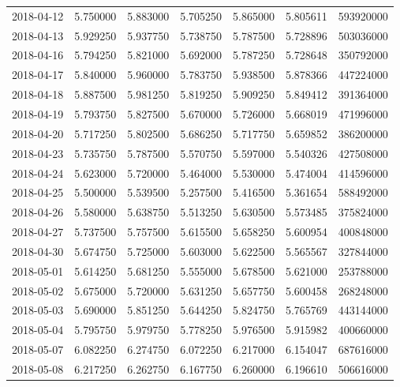 \begin{tabular}{lrrrrrr}
2018-04-12 &    5.750000 &    5.883000 &    5.705250 &    5.865000 &    5.805611 &   593920000 \\
2018-04-13 &    5.929250 &    5.937750 &    5.738750 &    5.787500 &    5.728896 &   503036000 \\
2018-04-16 &    5.794250 &    5.821000 &    5.692000 &    5.787250 &    5.728648 &   350792000 \\
2018-04-17 &    5.840000 &    5.960000 &    5.783750 &    5.938500 &    5.878366 &   447224000 \\
2018-04-18 &    5.887500 &    5.981250 &    5.819250 &    5.909250 &    5.849412 &   391364000 \\
2018-04-19 &    5.793750 &    5.827500 &    5.670000 &    5.726000 &    5.668019 &   471996000 \\
2018-04-20 &    5.717250 &    5.802500 &    5.686250 &    5.717750 &    5.659852 &   386200000 \\
2018-04-23 &    5.735750 &    5.787500 &    5.570750 &    5.597000 &    5.540326 &   427508000 \\
2018-04-24 &    5.623000 &    5.720000 &    5.464000 &    5.530000 &    5.474004 &   414596000 \\
2018-04-25 &    5.500000 &    5.539500 &    5.257500 &    5.416500 &    5.361654 &   588492000 \\
2018-04-26 &    5.580000 &    5.638750 &    5.513250 &    5.630500 &    5.573485 &   375824000 \\
2018-04-27 &    5.737500 &    5.757500 &    5.615500 &    5.658250 &    5.600954 &   400848000 \\
2018-04-30 &    5.674750 &    5.725000 &    5.603000 &    5.622500 &    5.565567 &   327844000 \\
2018-05-01 &    5.614250 &    5.681250 &    5.555000 &    5.678500 &    5.621000 &   253788000 \\
2018-05-02 &    5.675000 &    5.720000 &    5.631250 &    5.657750 &    5.600458 &   268248000 \\
2018-05-03 &    5.690000 &    5.851250 &    5.644250 &    5.824750 &    5.765769 &   443144000 \\
2018-05-04 &    5.795750 &    5.979750 &    5.778250 &    5.976500 &    5.915982 &   400660000 \\
2018-05-07 &    6.082250 &    6.274750 &    6.072250 &    6.217000 &    6.154047 &   687616000 \\
2018-05-08 &    6.217250 &    6.262750 &    6.167750 &    6.260000 &    6.196610 &   506616000 \\

\end{tabular}
